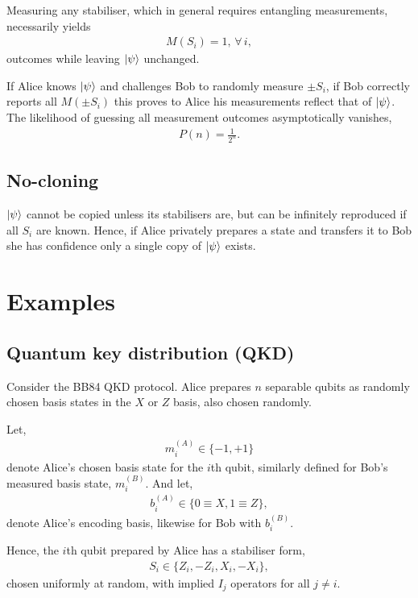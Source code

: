 \documentclass[twocolumn, aps, amsmath, amssymb, nofootinbib, superscriptaddress, longbibliography, doublefloatfix, table-of-contents, eqsecnum, rmp]{revtex4-2}
\begin{document}
Measuring any stabiliser, which in general requires entangling measurements, necessarily yields
\begin{align}
M(S_i)=1,\,\forall\,i,
\end{align}
outcomes while leaving $\ket\psi$ unchanged.

If Alice knows $\ket\psi$ and challenges Bob to randomly measure $\pm S_i$, if Bob correctly reports all $M(\pm S_i)$ this proves to Alice his measurements reflect that of $\ket\psi$. The likelihood of guessing all measurement outcomes asymptotically vanishes,
\begin{align}
	P(n) = \frac{1}{2^n}.
\end{align}

\subsection{No-cloning}

$\ket\psi$ cannot be copied unless its stabilisers are, but can be infinitely reproduced if all $S_i$ are known. Hence, if Alice privately prepares a state and transfers it to Bob she has confidence only a single copy of $\ket\psi$ exists.

\section{Examples}

\subsection{Quantum key distribution (QKD)}

Consider the BB84 QKD protocol. Alice prepares $n$ separable qubits as randomly chosen basis states in the $X$ or $Z$ basis, also chosen randomly.

Let,
\begin{align}
	m_i^{(A)} \in \{-1,+1\}
\end{align} 
denote Alice's chosen basis state for the $i$th qubit, similarly defined for Bob's measured basis state, $m_i^{(B)}$. And let,
\begin{align}
	b_i^{(A)} \in \{0\equiv X,1\equiv Z\},
\end{align}
denote Alice's encoding basis, likewise for Bob with $b_i^{(B)}$.

Hence, the $i$th qubit prepared by Alice has a stabiliser form,
\begin{align}
	S_i \in \{Z_i, -Z_i, X_i, -X_i\},
\end{align}
chosen uniformly at random, with implied $I_j$ operators for all $j\neq i$.
\end{document}
